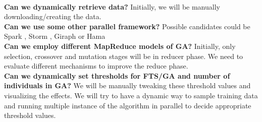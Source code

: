 \documentclass[12pt,journal,compsoc]{IEEEtran}
\begin{document}
  \\\indent \textbf{Can we dynamically retrieve data?} Initially, we will be manually downloading/creating the data.
  \\\indent \textbf{Can we use some other parallel framework?} Possible candidates could be Spark \cite{spark-site}, Storm \cite{storm-site}, Giraph \cite{giraph-site} or Hama \cite{hama-site}
  \\\indent \textbf{Can we employ different MapReduce models of GA?} Initially, only selection, crossover and mutation stages will be in reducer phase. We need to evaluate different mechanisms to improve the reduce phase.
  \\\indent \textbf{Can we dynamically set thresholds for FTS/GA and number of individuals in GA?} We will be manually tweaking these threshold values and visualizing the effects. We will try to have a dynamic way to sample training data and running multiple instance of the algorithm in parallel to decide appropriate threshold values.




%
%
\end{document}
